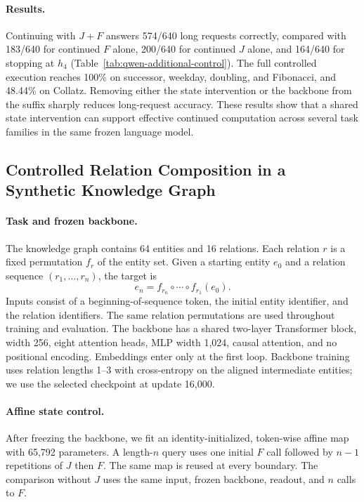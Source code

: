 \documentclass{article}
\begin{document}
\paragraph{Results.}
Continuing with $J+F$ answers 574/640 long requests correctly, compared with 183/640 for continued $F$ alone, 200/640 for continued $J$ alone, and 164/640 for stopping at $h_4$ (Table~\ref{tab:qwen-additional-control}). The full controlled execution reaches 100\% on successor, weekday, doubling, and Fibonacci, and 48.44\% on Collatz. Removing either the state intervention or the backbone from the suffix sharply reduces long-request accuracy. These results show that a shared state intervention can support effective continued computation across several task families in the same frozen language model.

\FloatBarrier
\clearpage
\subsection{Controlled Relation Composition in a Synthetic Knowledge Graph}
\label{app:kg-control}

\paragraph{Task and frozen backbone.}
The knowledge graph contains 64 entities and 16 relations. Each relation $r$ is a fixed permutation $f_r$ of the entity set. Given a starting entity $e_0$ and a relation sequence $(r_1,\ldots,r_n)$, the target is
\begin{equation}
e_n=f_{r_n}\circ\cdots\circ f_{r_1}(e_0).
\end{equation}
Inputs consist of a beginning-of-sequence token, the initial entity identifier, and the relation identifiers. The same relation permutations are used throughout training and evaluation. The backbone has a shared two-layer Transformer block, width 256, eight attention heads, MLP width 1,024, causal attention, and no positional encoding. Embeddings enter only at the first loop. Backbone training uses relation lengths 1--3 with cross-entropy on the aligned intermediate entities; we use the selected checkpoint at update 16,000.

\paragraph{Affine state control.}
After freezing the backbone, we fit an identity-initialized, token-wise affine map with 65,792 parameters. A length-$n$ query uses one initial $F$ call followed by $n-1$ repetitions of $J$ then $F$. The same map is reused at every boundary. The comparison without $J$ uses the same input, frozen backbone, readout, and $n$ calls to $F$.
\end{document}
